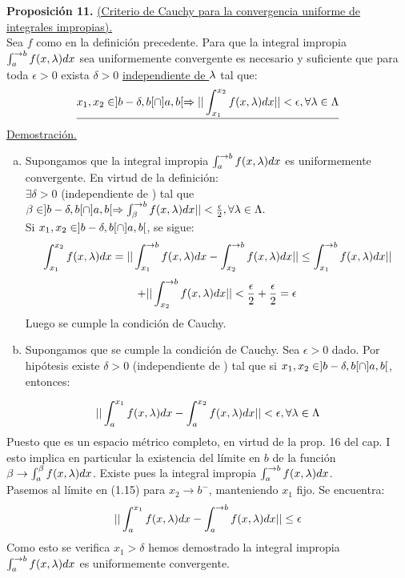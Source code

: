 \textbf{Proposición 11. } \underline{(Criterio de Cauchy para la convergencia uniforme de integrales impropias).}\\
Sea $f$ como en la definición precedente. Para que la integral impropia $\int_{a}^{\to b} f(x,\lambda)dx$ sea uniformemente convergente es necesario y suficiente que para toda $\epsilon>0$ exista $\delta >0$ \underline{independiente de $\lambda$} tal que:\\
$$
\underline{x_1,x_2 \in ]b-\delta,b[ \cap ]a,b[ \Rightarrow || \int_{x_1}^{x_2}f(x,\lambda)dx||< \epsilon, \phantom{} \forall \lambda \in \Lambda}
$$
\underline{Demostración.}\\
\begin{enumerate}[a)]
\item Supongamos que la integral impropia $\int_a^{\to b}f(x,\lambda)dx$ es uniformemente convergente. En virtud de la definición:\\
$\exists \delta >0$ (independiente de \lam) tal que $\beta \in ]b-\delta,b[ \cap ]a,b[ \Rightarrow \int_\beta^{\to b}f(x,\lambda)dx|| < \frac{\epsilon}{2}, \forall \lambda \in \Lambda.$\\
Si $x_1,x_2 \in ]b-\delta,b[ \cap ]a,b[$, se sigue:\\
$$\int_{x_1}^{x_2}f(x,\lambda)dx= || \int_{x_1}^{\to b}f(x,\lambda)dx-\int_{x_2}^{\to b}f(x,\lambda)dx|| \leq \int_{x_1}^{\to b}f(x,\lambda)dx ||$$
$$+|| \int_{x_2}^{\to b}f(x,\lambda)dx || < \frac{\epsilon}{2}+\frac{\epsilon}{2}=\epsilon$$
Luego se cumple la condición de Cauchy. \\
\item Supongamos que se cumple la condición de Cauchy. Sea $\epsilon>0$ dado. Por hipótesis existe $\delta>0$ (independiente de \lam) tal que si $x_1,x_2 \in ]b-\delta,b[ \cap ]a,b[$, entonces:
\end{enumerate}
\begin{equation}
|| \int_a^{x_1}f(x,\lambda)dx-\int_a^{x_2}f(x,\lambda)dx || < \epsilon, \forall \lambda \in \Lambda
\end{equation}
Puesto que \F \phantom{} es un espacio métrico completo, en virtud de la prop. 16 del cap. $\mathrm{I}$ esto implica en particular la existencia del límite en $b$ de la función $\beta \rightarrow \int_a^\beta f(x,\lambda)dx$. Existe pues la integral impropia $\int_a^{\to b} f(x,\lambda)dx$.\\
Pasemos al límite en (1.15) para $x_2 \to b^{-}$, manteniendo $x_1$ fijo. Se encuentra:\\
$$
|| \int_a^{x_1}f(x,\lambda)dx-\int_a^{\to b}f(x,\lambda)dx || \leq \epsilon
$$
Como esto se verifica \todo \phantom{} $x_1>\delta$ hemos demostrado la integral impropia $\int_a^{\to b}f(x,\lambda)dx$ es uniformemente convergente.\\ \\

